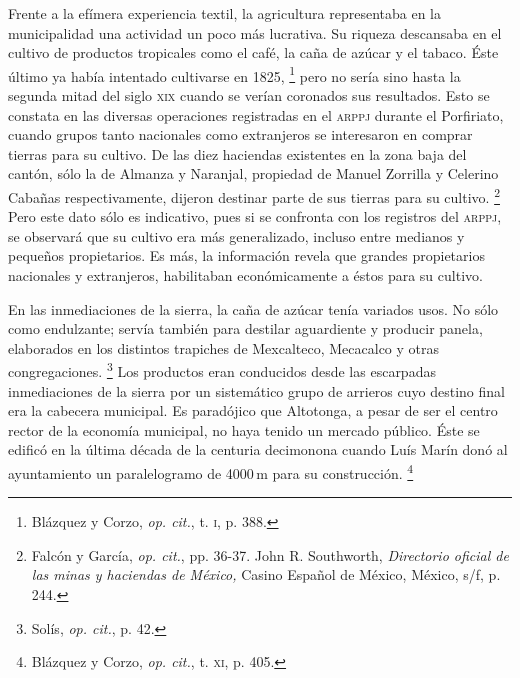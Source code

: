 \documentclass[14pt,twoside,final]{extbook} %
\let\oldfootnote\footnote
\renewcommand\footnote[1]{%
\oldfootnote{\hspace{1mm}#1}}
\begin{document}
Frente a la efímera experiencia textil, la agricultura representaba en la municipalidad una actividad un poco más lucrativa. Su riqueza descansaba en el cultivo de productos tropicales como el café, la caña de azúcar y el tabaco. Éste último ya había intentado cultivarse en 1825,\footnote{Blázquez y Corzo, \emph{op. cit.}, t. \textsc{i}, p. 388.} pero no sería sino hasta la segunda mitad del siglo \textsc{xix} cuando se verían coronados sus resultados. Esto se constata en las diversas operaciones registradas en el \textsc{arppj} durante el Porfiriato, cuando grupos tanto nacionales como extranjeros se interesaron en comprar tierras para su cultivo. De las diez haciendas existentes en la zona baja del cantón, sólo la de Almanza y Naranjal, propiedad de Manuel Zorrilla y Celerino Cabañas respectivamente, dijeron destinar parte de sus tierras para su cultivo.\footnote{Falcón y García, \emph{op. cit.}, pp. 36-37. John R. Southworth, \emph{Directorio oficial de las minas y haciendas de México,} Casino Español de México, México, s/f, p. 244.} Pero este dato sólo es indicativo, pues si se confronta con los registros del \textsc{arppj}, se observará que su cultivo era más generalizado, incluso entre medianos y pequeños propietarios. Es más, la información revela que grandes propietarios nacionales y extranjeros, habilitaban económicamente a éstos para su cultivo.

En las inmediaciones de la sierra, la caña de azúcar tenía variados usos. No sólo como endulzante; servía también para destilar aguardiente y producir panela, elaborados en los distintos trapiches de Mexcalteco, Mecacalco y otras congregaciones.\footnote{Solís, \emph{op. cit.}, p. 42.} Los productos eran conducidos desde las escarpadas inmediaciones de la sierra por un sistemático grupo de arrieros cuyo destino final era la cabecera municipal. Es paradójico que Altotonga, a pesar de ser el centro rector de la economía municipal, no haya tenido un mercado público. Éste se edificó en la última década de la centuria decimonona cuando Luís Marín donó al ayuntamiento un paralelogramo de 4000\,m para su construcción.\footnote{Blázquez y Corzo, \emph{op. cit.}, t. \textsc{xi}, p. 405.}
\end{document}
